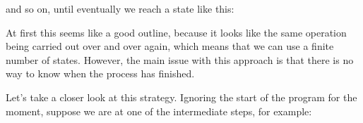 and so on, until eventually we reach a state like this:

\begin{center}
\end{center}

At first this seems like a good outline, because it looks like the same operation being carried out over and over again, which means that we can use a finite number of states. However, the main issue with this approach is that there is no way to know when the process has finished.

Let's take a closer look at this strategy. Ignoring the start of the program for the moment, suppose we are at one of the intermediate steps, for example:

